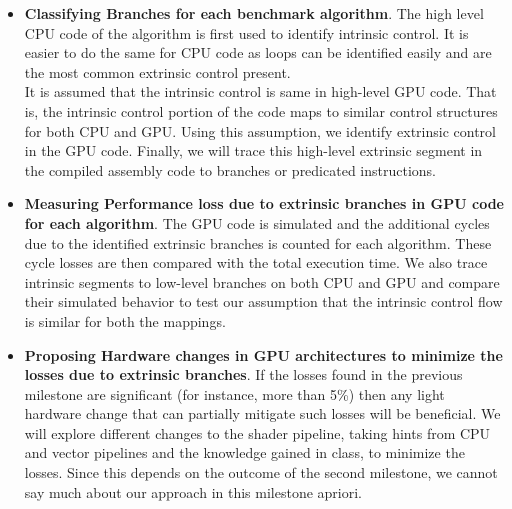 \begin{itemize}

\item \textbf{Classifying Branches for each benchmark algorithm}. The high level CPU code of the algorithm is first used to identify intrinsic control. It is easier to do the same for CPU code as loops can be identified easily and are the most common extrinsic control present.
\\
It is assumed that the intrinsic control is same in high-level GPU code. That is, the intrinsic control portion of the code maps to similar control structures for both CPU and GPU. Using this assumption, we identify extrinsic control in the GPU code. Finally, we will trace this high-level extrinsic segment in the compiled assembly code to branches or predicated instructions.

\item \textbf{Measuring Performance loss due to extrinsic branches in GPU code for each algorithm}. The GPU code is simulated and the additional cycles due to the identified extrinsic branches is counted for each algorithm. These cycle losses are then compared with the total execution time. We also trace intrinsic segments to low-level branches on both CPU and GPU and compare their simulated behavior to test our assumption that the intrinsic control flow is similar for both the mappings. 

\item \textbf{Proposing Hardware changes in GPU architectures to minimize the losses due to extrinsic branches}. If the losses found in the previous milestone are significant (for instance, more than 5\%) then any light hardware change that can partially mitigate such losses will be beneficial. We will explore different changes to the shader pipeline, taking hints from CPU and vector pipelines and the knowledge gained in class, to minimize the losses. Since this depends on the outcome of the second milestone, we cannot say much about our approach in this milestone apriori. 

\end{itemize}
